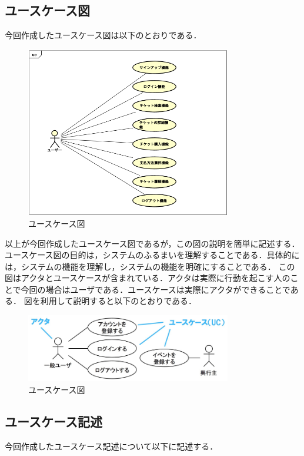 \documentclass{ltjsarticle}
\begin{document}
\subsection{ユースケース図}
今回作成したユースケース図は以下のとおりである．
\begin{figure}[H]
    \centering
    \includegraphics[width=0.8\textwidth]{src/Usecase.png}
    \caption{ユースケース図}
    \label{fig:use_case}
\end{figure}

以上が今回作成したユースケース図であるが，この図の説明を簡単に記述する．
ユースケース図の目的は，システムのふるまいを理解することである．具体的には，システムの機能を理解し，システムの機能を明確にすることである．
この図はアクタとユースケースが含まれている．アクタは実際に行動を起こす人のことで今回の場合はユーザである．ユースケースは実際にアクタができることである．
図を利用して説明すると以下のとおりである．

\begin{figure}[H]
    \centering
    \includegraphics[width=0.8\textwidth]{src/ExampleUsecase.png}
    \caption{ユースケース図}
    \label{fig:use_case2}
\end{figure}

\subsection{ユースケース記述}
今回作成したユースケース記述について以下に記述する．
\end{document}
